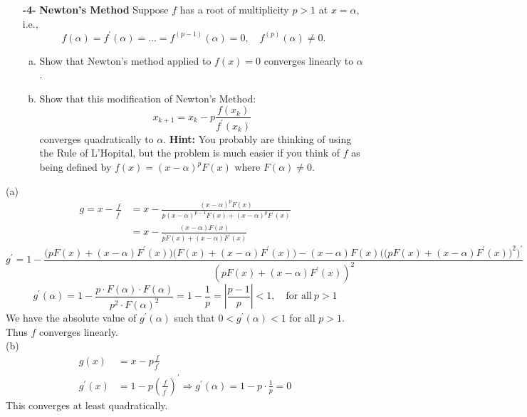 \documentclass[11pt]{article}
\theoremstyle{definition}
\newcommand{\1}[1]{\mathbf{1} \left \{ #1 \right \}}
\begin{document}
\begin{itemize}
    \item[{\textbf{-4-}}] \textbf{Newton's Method}  Suppose $f$ has a root of multiplicity $p>1$ at $x=\alpha$, i.e.,
    \begin{equation}
        f(\alpha) = f^{\prime} (\alpha) = ... = f^{(p-1)} (\alpha) = 0, \quad f^{(p)} (\alpha) \neq 0.
    \end{equation}
    \begin{enumerate}[a.]
        \item Show that Newton's method applied to $f(x) = 0$ converges linearly to $\alpha$.
        \item Show that this modification of Newton's Method:
        \begin{equation}
            x_{k+1} = x_k - p \frac{f(x_k)}{f^{\prime}(x_k)}
        \end{equation}
        converges quadratically to $\alpha$.  \textbf{Hint:}  You probably are thinking of using the Rule of L'Hopital, but the problem is much easier if you think of $f$ as being defined by $f(x) = (x-\alpha)^p F(x)$ where $F(\alpha) \neq 0.$
        \end{enumerate}
\end{itemize}
(a)
\begin{equation*}
    \begin{split}
        g = x - \frac{f}{f^{\prime}} &= x - \frac{(x-\alpha)^p F(x)}{p(x-\alpha)^{p-1} F(x) + (x-\alpha)^p F^{\prime} (x)} \\
        &= x - \frac{(x-\alpha) F(x)}{pF(x) + (x-\alpha)F^{\prime}(x)}
    \end{split}
\end{equation*}
\[g^{\prime} = 1 - \frac{\big(pF(x) + (x-\alpha)F^{\prime}(x)\big) \big(F(x) + (x-\alpha)F^{\prime}(x)\big) - (x-\alpha)F(x) \Big(\big(pF(x) + (x-\alpha)F^{\prime}(x)\big)^2\Big)^{\prime}}{\left(pF(x) + (x-\alpha)F^{\prime}(x)\right)^2}\]
\[g^{\prime}(\alpha) = 1 - \frac{p \cdot F(\alpha) \cdot F(\alpha)}{p^2 \cdot F(\alpha)^2} = 1 - \frac{1}{p} = \left|\frac{p-1}{p}\right| < 1, \quad \text{for all} \ p > 1\]
We have the absolute value of $g^{\prime}(\alpha)$ such that $0 < g^{\prime}(\alpha) < 1$ for all $p>1$.  Thus $f$ converges linearly. \\
(b)
\begin{equation*}
    \begin{split}
        g(x) &= x - p \frac{f}{f^{\prime}} \\
        g^{\prime}(x) &= 1 - p \left(\frac{f}{f^{\prime}}\right)^{\prime} \Longrightarrow g^{\prime}(\alpha) = 1 - p \cdot \frac{1}{p} = 0
    \end{split}
\end{equation*}
This converges at least quadratically.
\end{document}
